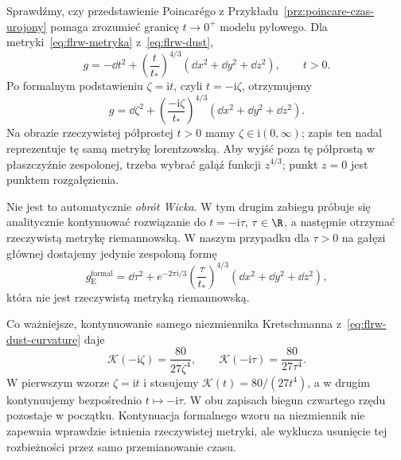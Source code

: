 \begin{przyklad}
\label{prz:flrw-czas-zespolony}
Sprawdźmy, czy przedstawienie Poincarégo z
Przykładu~\ref{prz:poincare-czas-urojony} pomaga
zrozumieć granicę $t\to0^+$ modelu pyłowego.
Dla metryki~\eqref{eq:flrw-metryka} z~\eqref{eq:flrw-dust},
\[
 g=-\dd t^2+\left(\frac{t}{t_*}\right)^{4/3}
    (\dd x^2+\dd y^2+\dd z^2),\qquad t>0.
\]
Po formalnym podstawieniu $\zeta=\mathrm{i}t$,
czyli $t=-\mathrm{i}\zeta$, otrzymujemy
\begin{equation}\label{eq:flrw-complex-time}
 g=\dd\zeta^2+
 \left(\frac{-\mathrm{i}\zeta}{t_*}\right)^{4/3}
 (\dd x^2+\dd y^2+\dd z^2).
\end{equation}
Na obrazie rzeczywistej półprostej $t>0$ mamy
$\zeta\in\mathrm{i}(0,\infty)$; zapis ten nadal
reprezentuje tę samą metrykę lorentzowską.
Aby wyjść poza tę półprostą w płaszczyźnie
zespolonej, trzeba wybrać gałąź funkcji
$z^{4/3}$; punkt $z=0$ jest punktem rozgałęzienia.

Nie jest to automatycznie \emph{obrót Wicka}.
W tym drugim zabiegu próbuje się analitycznie
kontynuować rozwiązanie do $t=-\mathrm{i}\tau$,
$\tau\in\R$, a następnie otrzymać rzeczywistą
metrykę riemannowską. W naszym przypadku dla
$\tau>0$ na gałęzi głównej dostajemy jedynie
zespoloną formę
\[
 g_{\mathrm E}^{\mathrm{formal}}
 =\dd\tau^2+e^{-2\pi\mathrm{i}/3}
  \left(\frac{\tau}{t_*}\right)^{4/3}
  (\dd x^2+\dd y^2+\dd z^2),
\]
która nie jest rzeczywistą metryką riemannowską.

Co ważniejsze, kontynuowanie samego niezmiennika
Kretschmanna z~\eqref{eq:flrw-dust-curvature}
daje
\[
 \mathcal K(-\mathrm{i}\zeta)
  =\frac{80}{27\zeta^4},\qquad
 \mathcal K(-\mathrm{i}\tau)
  =\frac{80}{27\tau^4}.
\]
W pierwszym wzorze $\zeta=\mathrm{i}t$ i stosujemy
$\mathcal K(t)=80/(27t^4)$, a w drugim
kontynuujemy bezpośrednio $t\mapsto-\mathrm{i}\tau$.
W obu zapisach biegun czwartego rzędu pozostaje
w początku. Kontynuacja formalnego wzoru na
niezmiennik nie zapewnia wprawdzie istnienia
rzeczywistej metryki, ale wyklucza usunięcie
tej rozbieżności przez samo przemianowanie czasu.


\end{przyklad}
